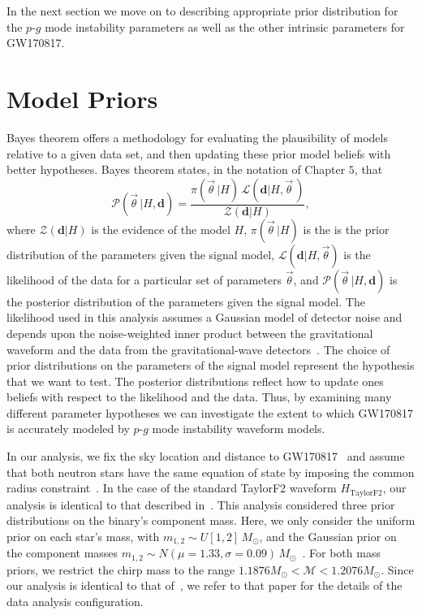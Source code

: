 In the next section we move on to describing appropriate prior distribution for the $p$-$g$ mode instability parameters as well as the other intrinsic parameters for GW170817.

\section{Model Priors} \label{sec:priors}
Bayes theorem offers a methodology for evaluating the plausibility of models relative to a given data set, and then updating these prior model beliefs with better hypotheses. Bayes theorem states, in the notation of Chapter $5$, that
\begin{equation}
\mathcal{P}\left(\vec{\theta}\,| H, \mathbf{d}\right) = \frac{\pi\left(\vec{\theta}\,|H\right) \, \mathcal{L}\left(\mathbf{d}|H, \vec{\theta}\,\right)}{\mathcal{Z}\left(\mathbf{d}|H\right)},
\label{eq:bayestheorem}
\end{equation}
where $\mathcal{Z} \left(\mathbf{d}|H \right)$ is the evidence of the model $H$, $\pi \left(\vec{\theta}\,|H\right)$ is the is the prior distribution of the parameters given the signal model, $\mathcal{L}\left(\mathbf{d}|H, \vec{\theta}\right)$ is the likelihood of the data for a particular set of parameters $\vec{\theta}$, and $\mathcal{P}\left( \vec{\theta}\,|H, \mathbf{d}\right)$ is the posterior distribution of the parameters given the signal model. The likelihood used in this analysis assumes a Gaussian model of detector noise and depends upon the noise-weighted inner product between the gravitational waveform and the data from the gravitational-wave detectors~\citep{Finn:2000hj,Rover:2006bb}. The choice of prior distributions on the parameters of the signal model represent the hypothesis that we want to test. The posterior distributions reflect how to update ones beliefs with respect to the likelihood and the data. Thus, by examining many different parameter hypotheses we can investigate the extent to which GW170817 is accurately modeled by $p$-$g$ mode instability waveform models.

In our analysis, we fix the sky location and distance to GW170817~\citep{Soares-Santos:2017lru,Cantiello:2018ffy} and assume that both neutron stars have the same equation of state by imposing the common radius constraint~\citep{de2018tidal}. In the case of the standard TaylorF2 waveform $H_\mathrm{TaylorF2}$, our analysis is identical to that described in~\cite{de2018tidal}. This analysis considered three prior distributions on the binary's component mass. Here, we only consider the uniform prior on each star's mass, with $m_{1,2} \sim U[1,2]\, M_\odot$, and the Gaussian prior on the component masses $m_{1,2} \sim N(\mu = 1.33, \sigma = 0.09)\, M_\odot$~\citep{Ozel:2016oaf}. For both mass priors, we restrict the chirp mass to the range $ 1.1876 M_\odot < \mathcal{M} < 1.2076 M_\odot$. Since our analysis is identical to that of~\citep{de2018tidal}, we refer to that paper for the details of the data analysis configuration.

